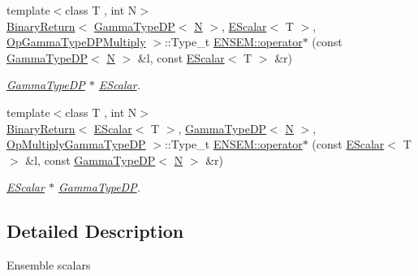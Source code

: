 \begin{DoxyCompactItemize}
{\footnotesize template$<$class T , int N$>$ }\\\mbox{\hyperlink{structENSEM_1_1BinaryReturn}{Binary\+Return}}$<$ \mbox{\hyperlink{classENSEM_1_1GammaTypeDP}{Gamma\+Type\+DP}}$<$ \mbox{\hyperlink{operator__name__util_8cc_a7722c8ecbb62d99aee7ce68b1752f337}{N}} $>$, \mbox{\hyperlink{classENSEM_1_1EScalar}{E\+Scalar}}$<$ T $>$, \mbox{\hyperlink{structENSEM_1_1OpGammaTypeDPMultiply}{Op\+Gamma\+Type\+D\+P\+Multiply}} $>$\+::Type\+\_\+t \mbox{\hyperlink{group__escalar_ga54ffca46c333d9dad30043eb6cef6299}{E\+N\+S\+E\+M\+::operator$\ast$}} (const \mbox{\hyperlink{classENSEM_1_1GammaTypeDP}{Gamma\+Type\+DP}}$<$ \mbox{\hyperlink{operator__name__util_8cc_a7722c8ecbb62d99aee7ce68b1752f337}{N}} $>$ \&l, const \mbox{\hyperlink{classENSEM_1_1EScalar}{E\+Scalar}}$<$ T $>$ \&r)
\begin{DoxyCompactList}\small\item\em \mbox{\hyperlink{classENSEM_1_1GammaTypeDP}{Gamma\+Type\+DP}} $\ast$ \mbox{\hyperlink{classENSEM_1_1EScalar}{E\+Scalar}}. \end{DoxyCompactList}\item 
{\footnotesize template$<$class T , int N$>$ }\\\mbox{\hyperlink{structENSEM_1_1BinaryReturn}{Binary\+Return}}$<$ \mbox{\hyperlink{classENSEM_1_1EScalar}{E\+Scalar}}$<$ T $>$, \mbox{\hyperlink{classENSEM_1_1GammaTypeDP}{Gamma\+Type\+DP}}$<$ \mbox{\hyperlink{operator__name__util_8cc_a7722c8ecbb62d99aee7ce68b1752f337}{N}} $>$, \mbox{\hyperlink{structENSEM_1_1OpMultiplyGammaTypeDP}{Op\+Multiply\+Gamma\+Type\+DP}} $>$\+::Type\+\_\+t \mbox{\hyperlink{group__escalar_ga546f1e55f2e4eda7a887fbf4fcaa177f}{E\+N\+S\+E\+M\+::operator$\ast$}} (const \mbox{\hyperlink{classENSEM_1_1EScalar}{E\+Scalar}}$<$ T $>$ \&l, const \mbox{\hyperlink{classENSEM_1_1GammaTypeDP}{Gamma\+Type\+DP}}$<$ \mbox{\hyperlink{operator__name__util_8cc_a7722c8ecbb62d99aee7ce68b1752f337}{N}} $>$ \&r)
\begin{DoxyCompactList}\small\item\em \mbox{\hyperlink{classENSEM_1_1EScalar}{E\+Scalar}} $\ast$ \mbox{\hyperlink{classENSEM_1_1GammaTypeDP}{Gamma\+Type\+DP}}. \end{DoxyCompactList}\end{DoxyCompactItemize}


\subsection{Detailed Description}
Ensemble scalars 

